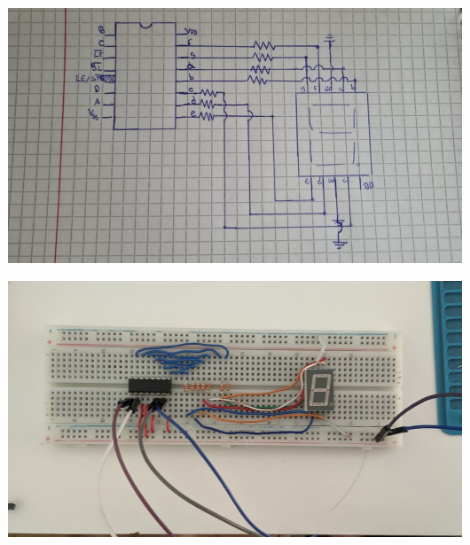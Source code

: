 \includegraphics[width=0.9\textwidth]{./imagenes/esquematico.jpeg}

\newpage

\includegraphics[width=0.9\textwidth]{./imagenes/circuito.jpeg}


